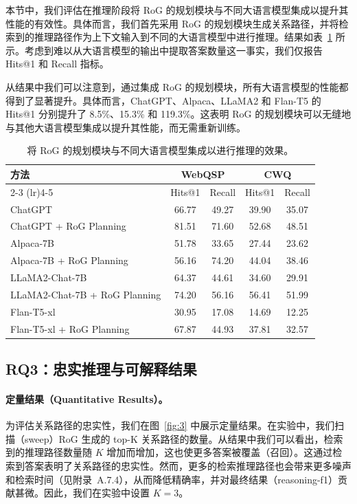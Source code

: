 \documentclass[11pt,UTF8,fontset=fandol]{ctexart}
\begin{document}
本节中，我们评估在推理阶段将 RoG 的规划模块与不同大语言模型集成以提升其性能的有效性。具体而言，我们首先采用 RoG 的规划模块生成关系路径，并将检索到的推理路径作为上下文输入到不同的大语言模型中进行推理。结果如表~\ref{tab:3} 所示。考虑到难以从大语言模型的输出中提取答案数量这一事实，我们仅报告 Hits@1 和 Recall 指标。

从结果中我们可以注意到，通过集成 RoG 的规划模块，所有大语言模型的性能都得到了显著提升。具体而言，ChatGPT、Alpaca、LLaMA2 和 Flan-T5 的 Hits@1 分别提升了 8.5\%、15.3\% 和 119.3\%。这表明 RoG 的规划模块可以无缝地与其他大语言模型集成以提升其性能，而无需重新训练。

\begin{table}[H]
\centering
\caption{将 RoG 的规划模块与不同大语言模型集成以进行推理的效果。}
\label{tab:3}
\begin{tabular}{lcccc}
\toprule
\multirow{2}{*}{方法} & \multicolumn{2}{c}{WebQSP} & \multicolumn{2}{c}{CWQ} \\
\cmidrule(lr){2-3} \cmidrule(lr){4-5}
 & Hits@1 & Recall & Hits@1 & Recall \\
\midrule
ChatGPT                          & 66.77 & 49.27 & 39.90 & 35.07 \\
ChatGPT + RoG Planning           & 81.51 & 71.60 & 52.68 & 48.51 \\
Alpaca-7B                        & 51.78 & 33.65 & 27.44 & 23.62 \\
Alpaca-7B + RoG Planning         & 56.16 & 74.20 & 44.04 & 38.46 \\
LLaMA2-Chat-7B                   & 64.37 & 44.61 & 34.60 & 29.91 \\
LLaMA2-Chat-7B + RoG Planning    & 74.20 & 56.16 & 56.41 & 51.99 \\
Flan-T5-xl                       & 30.95 & 17.08 & 14.69 & 12.25 \\
Flan-T5-xl + RoG Planning        & 67.87 & 44.93 & 37.81 & 32.57 \\
\bottomrule
\end{tabular}
\end{table}

\subsection{RQ3：忠实推理与可解释结果}

\paragraph{定量结果（Quantitative Results）。}
为评估关系路径的忠实性，我们在图~\ref{fig:3} 中展示定量结果。在实验中，我们扫描（sweep）RoG 生成的 top-K 关系路径的数量。从结果中我们可以看出，检索到的推理路径数量随 $K$ 增加而增加，这也使更多答案被覆盖（召回）。这通过检索到答案表明了关系路径的忠实性。然而，更多的检索推理路径也会带来更多噪声和检索时间（见附录~A.7.4），从而降低精确率，并对最终结果（reasoning-f1）贡献甚微。因此，我们在实验中设置 $K = 3$。
\end{document}

